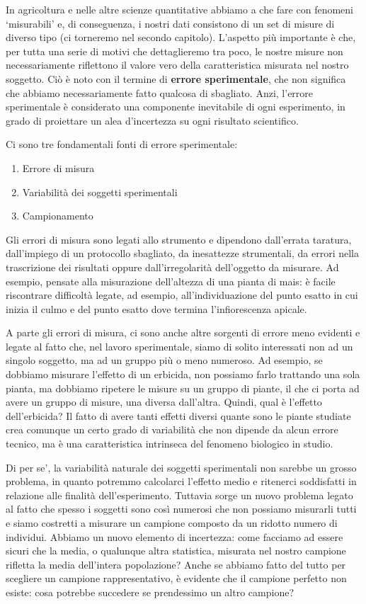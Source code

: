 \documentclass[a4paper,12pt,oneside]{book}
\providecommand{\tightlist}{%
  \setlength{\itemsep}{0pt}\setlength{\parskip}{0pt}}
\begin{document}
In agricoltura e nelle altre scienze quantitative abbiamo a che fare con fenomeni `misurabili' e, di conseguenza, i nostri dati consistono di un set di misure di diverso tipo (ci torneremo nel secondo capitolo). L'aspetto più importante è che, per tutta una serie di motivi che dettaglieremo tra poco, le nostre misure non necessariamente riflettono il valore vero della caratteristica misurata nel nostro soggetto. Ciò è noto con il termine di \textbf{errore sperimentale}, che non significa che abbiamo necessariamente fatto qualcosa di sbagliato. Anzi, l'errore sperimentale è considerato una componente inevitabile di ogni esperimento, in grado di proiettare un alea d'incertezza su ogni risultato scientifico.

Ci sono tre fondamentali fonti di errore sperimentale:

\begin{enumerate}
\def\labelenumi{\arabic{enumi}.}
\tightlist
\item
  Errore di misura
\item
  Variabilità dei soggetti sperimentali
\item
  Campionamento
\end{enumerate}

Gli errori di misura sono legati allo strumento e dipendono dall'errata taratura, dall'impiego di un protocollo sbagliato, da inesattezze strumentali, da errori nella trascrizione dei risultati oppure dall'irregolarità dell'oggetto da misurare. Ad esempio, pensate alla misurazione dell'altezza di una pianta di mais: è facile riscontrare difficoltà legate, ad esempio, all'individuazione del punto esatto in cui inizia il culmo e del punto esatto dove termina l'infiorescenza apicale.

A parte gli errori di misura, ci sono anche altre sorgenti di errore meno evidenti e legate al fatto che, nel lavoro sperimentale, siamo di solito interessati non ad un singolo soggetto, ma ad un gruppo più o meno numeroso. Ad esempio, se dobbiamo misurare l'effetto di un erbicida, non possiamo farlo trattando una sola pianta, ma dobbiamo ripetere le misure su un gruppo di piante, il che ci porta ad avere un gruppo di misure, una diversa dall'altra. Quindi, qual è l'effetto dell'erbicida? Il fatto di avere tanti effetti diversi quante sono le piante studiate crea comunque un certo grado di variabilità che non dipende da alcun errore tecnico, ma è una caratteristica intrinseca del fenomeno biologico in studio.

Di per se', la variabilità naturale dei soggetti sperimentali non sarebbe un grosso problema, in quanto potremmo calcolarci l'effetto medio e ritenerci soddisfatti in relazione alle finalità dell'esperimento. Tuttavia sorge un nuovo problema legato al fatto che spesso i soggetti sono così numerosi che non possiamo misurarli tutti e siamo costretti a misurare un campione composto da un ridotto numero di individui. Abbiamo un nuovo elemento di incertezza: come facciamo ad essere sicuri che la media, o qualunque altra statistica, misurata nel nostro campione rifletta la media dell'intera popolazione? Anche se abbiamo fatto del tutto per scegliere un campione rappresentativo, è evidente che il campione perfetto non esiste: cosa potrebbe succedere se prendessimo un altro campione?
\end{document}

